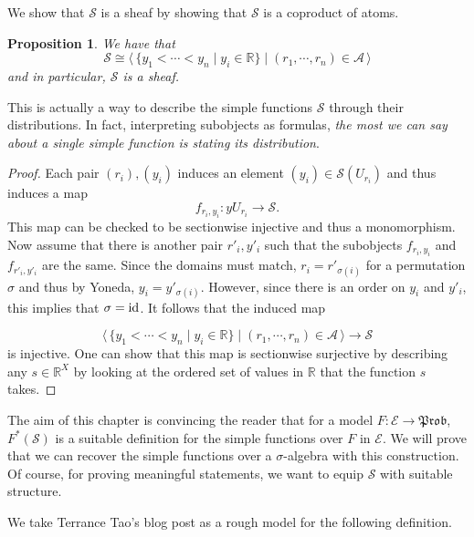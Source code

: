 \documentclass[a4paper]{amsproc}
\theoremstyle{plain}
\newtheorem{proposition}[theorem]{Proposition}
\theoremstyle{definition}
\theoremstyle{remark}
\numberwithin{equation}{section}
\newcommand{\id}{\textup{id}}
\newcommand{\y}{\textit{y}}
\newcommand{\Prob}{\mathfrak{Prob}}
\newcommand{\la}{\langle\,}
\newcommand{\ra}{\,\rangle}
\begin{document}
We show that $\mathcal{S}$ is a sheaf by showing that $\mathcal{S}$ is a coproduct of atoms.

\begin{proposition}
    We have that
    \[
        \mathcal{S} \cong \la \{y_1 < \cdots < y_n \mid y_i \in \mathbb{R} \} \mid (r_1, \cdots, r_n) \in \mathcal{A} \ra
    \]
    and in particular, $\mathcal{S}$ is a sheaf.
\end{proposition}

This is actually a way to describe the simple functions $\mathcal{S}$ through their distributions. In fact, interpreting subobjects as formulas, \emph{the most we can say about a single simple function is stating its distribution}.

\begin{proof}
    Each pair $(r_i), (y_i)$ induces an element $(y_i) \in \mathcal{S}(U_{r_i})$ and thus induces a map
    \[
        f_{r_i,y_i}: \y U_{r_i} \to \mathcal{S} .
    \]
    This map can be checked to be sectionwise injective and thus a monomorphism. Now assume that there is another pair $r'_i,y'_i$ such that the subobjects $f_{r_i,y_i}$ and $f_{r'_i,y'_i}$ are the same. Since the domains must match, $r_i = r'_{\sigma(i)}$ for a permutation $\sigma$ and thus by Yoneda, $y_i = y'_{\sigma(i)}$. However, since there is an order on $y_i$ and $y'_i$, this implies that $\sigma = \id$. It follows that the induced map

    \[
        \la \{y_1 < \cdots < y_n \mid y_i \in \mathbb{R} \} \mid (r_1, \cdots, r_n) \in \mathcal{A} \ra \to \mathcal{S}
    \]
    is injective. One can show that this map is sectionwise surjective by describing any $s \in \mathbb{R}^X$ by looking at the ordered set of values in $\mathbb{R}$ that the function $s$ takes.
\end{proof}

The aim of this chapter is convincing the reader that for a model $F: \mathcal{E} \to \Prob$, $F^*(\mathcal{S})$ is a suitable definition for the simple functions over $F$ in $\mathcal{E}$. We will prove that we can recover the simple functions over a $\sigma$-algebra with this construction. Of course, for proving meaningful statements, we want to equip $\mathcal{S}$ with suitable structure.

We take Terrance Tao's blog post \cite{tao2014algebraic} as a rough model for the following definition.
\end{document}

